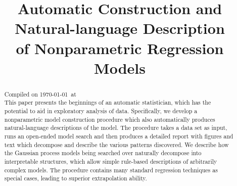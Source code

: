 \documentclass[letterpaper]{article}
\begin{document}
%
\title{Automatic Construction and Natural-language Description \\ of Nonparametric Regression Models}
\author{}
\maketitle






\begin{abstract} 
Compiled on \today\ at \currenttime
\\
This paper presents the beginnings of an automatic statistician, which has the potential to aid in exploratory analysis of data.
Specifically, we develop a nonparametric model construction procedure which also automatically produces natural-language descriptions of the model.
The procedure takes a data set as input, runs an open-ended model search and then produces a detailed report with figures and text which decompose and describe the various patterns discovered.
We describe how the Gaussian process models being searched over naturally decompose into interpretable structures, which allow simple rule-based descriptions of arbitrarily complex models.
The procedure contains many standard regression techniques as special cases, leading to superior extrapolation ability.
\end{abstract} 

\end{document}
